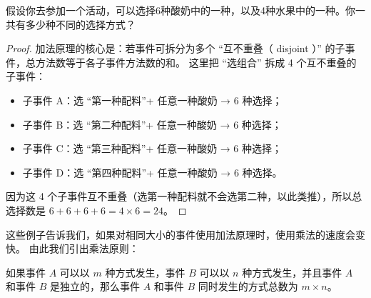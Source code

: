 \documentclass[lang=cn,math=mtpro2,11pt,scheme=chinese,pad]{elegantbook}
\begin{document}
\begin{example}
  假设你去参加一个活动，可以选择6种酸奶中的一种，以及4种水果中的一种。你一共有多少种不同的选择方式？
\end{example}
\begin{proof}
  加法原理的核心是：若事件可拆分为多个 “互不重叠（ disjoint ）” 的子事件，总方法数等于各子事件方法数的和。
这里把 “选组合” 拆成 4 个互不重叠的子事件：
\begin{itemize}
  \item 子事件 A：选 “第一种配料”+ 任意一种酸奶 → 6 种选择；
  \item 子事件 B：选 “第二种配料”+ 任意一种酸奶 → 6 种选择；
  \item 子事件 C：选 “第三种配料”+ 任意一种酸奶 → 6 种选择；
  \item 子事件 D：选 “第四种配料”+ 任意一种酸奶 → 6 种选择。
\end{itemize}
因为这 4 个子事件互不重叠（选第一种配料就不会选第二种，以此类推），所以总选择数是 \(6+6+6+6= 4 \times 6 = 24\)。
\end{proof}

这些例子告诉我们，如果对相同大小的事件使用加法原理时，使用乘法的速度会变快。
由此我们引出乘法原则：
\begin{theorem}[乘法原则]
  如果事件 \(A\) 可以以 \(m\) 种方式发生，事件 \(B\) 可以以 \(n\) 种方式发生，并且事件 \(A\) 和事件 \(B\) 是独立的，那么事件 \(A\) 和事件 \(B\) 同时发生的方式总数为 \(m \times n\)。
\end{theorem}
\end{document}
